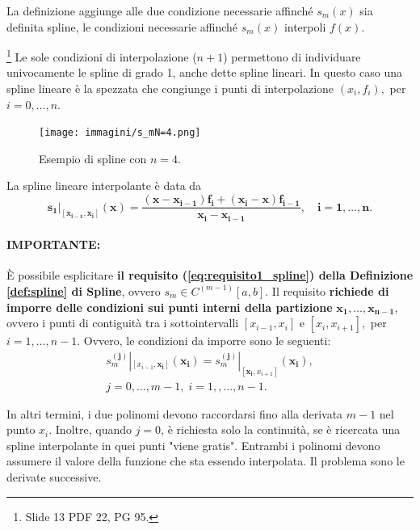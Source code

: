 La definizione aggiunge alle due condizione necessarie affinché $s_m(x)$ sia definita spline, le condizioni necessarie affinché $s_m(x)$ interpoli $f(x)$.

\begin{remark}
    \footnote{Slide 13 PDF 22, PG 95.} Le sole condizioni di interpolazione ($n+1$) permettono di individuare univocamente le spline di grado 1, anche dette spline lineari. In questo caso una spline lineare è la spezzata che congiunge i punti di interpolazione $(x_i,f_i),$ per $i=0,\hdots, n$.
\end{remark}

\begin{figure}
    \centering
    \texttt{[image: immagini/s\_mN=4.png]}
    \caption{Esempio di spline con $n=4$.}\label{fig:s_mN=4}
\end{figure}

\begin{definition}
	La spline lineare interpolante è data da 
	\begin{equation}\label{eq:spline_lineare}
		\boldsymbol{s_1|_{[x_{i-1}, x_i]}(x)=\frac{(x-x_{i-1})f_i+(x_i-x)f_{i-1}}{x_i-x_{i-1}},\quad i=1,\hdots,n.}
	\end{equation}
\end{definition}

\paragraph{IMPORTANTE:} È possibile esplicitare \textbf{il requisito (\ref{eq:requisito1_spline}) della Definizione \ref{def:spline} di Spline}, ovvero $s_m \in C^{(m-1)}[a,b]$. Il requisito \textbf{richiede di imporre delle condizioni sui punti interni della partizione} $\boldsymbol{x_1,\hdots,x_{n-1}}$, ovvero i punti di contiguità tra i sottointervalli $[x_{i-1},x_i]$ e $[x_i,x_{i+1}],$ per $ i=1,\hdots,n-1$. Ovvero, le condizioni da imporre sono le seguenti:
\begin{equation}\label{eq:condizioni_continuita_spline}
    \begin{matrix}
        s_m^{(\boldsymbol{j})}|_{[x_{i-1},\boldsymbol{x_i}]}(\boldsymbol{x_i})= s_m^{(\boldsymbol{j})}|_{[\boldsymbol{x_i},x_{i+1}]}(\boldsymbol{x_i}),\\
        j=0,\hdots,m-1,\; i=1,,\hdots,n-1.
    \end{matrix}
\end{equation}

\noindent In altri termini, i due polinomi devono raccordarsi fino alla derivata $m-1$ nel punto $x_i$. Inoltre, quando $j=0$, è richiesta solo la continuità, se è ricercata una spline interpolante in quei punti "viene gratis". Entrambi i polinomi devono assumere il valore della funzione che sta essendo interpolata. Il problema sono le derivate successive.\\


